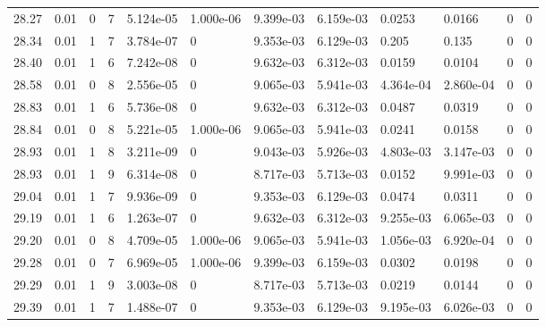 \documentclass[preview]{standalone}
\begin{document}
{{{{{{{{{{\begin{tabular}{L{1.2cm}C{1.2cm} C{0.3cm}C{0.5cm} C{1.4cm}C{1.4cm} C{1.4cm}C{1.4cm} C{1.6cm}C{1.6cm} C{1.6cm}C{1.6cm}}
  28.27  &  0.01  & 0     &  7 &  5.124e-05  & 1.000e-06  &  9.399e-03&   6.159e-03& 0.0253 & 0.0166   &  0 & 0  \\ 
  28.34  &  0.01  & 1     &  7 &  3.784e-07  & 0  &  9.353e-03&   6.129e-03& 0.205 & 0.135   &  0 & 0  \\ 
  28.40  &  0.01  & 1     &  6 &  7.242e-08  & 0  &  9.632e-03&   6.312e-03& 0.0159 & 0.0104   &  0 & 0  \\ 
  28.58  &  0.01  & 0     &  8 &  2.556e-05  & 0  &  9.065e-03&   5.941e-03& 4.364e-04 & 2.860e-04   &  0 & 0  \\ 
  28.83  &  0.01  & 1     &  6 &  5.736e-08  & 0  &  9.632e-03&   6.312e-03& 0.0487 & 0.0319   &  0 & 0  \\ 
  28.84  &  0.01  & 0     &  8 &  5.221e-05  & 1.000e-06  &  9.065e-03&   5.941e-03& 0.0241 & 0.0158   &  0 & 0  \\ 
  28.93  &  0.01  & 1     &  8 &  3.211e-09  & 0  &  9.043e-03&   5.926e-03& 4.803e-03 & 3.147e-03   &  0 & 0  \\ 
  28.93  &  0.01  & 1     &  9 &  6.314e-08  & 0  &  8.717e-03&   5.713e-03& 0.0152 & 9.991e-03   &  0 & 0  \\ 
  29.04  &  0.01  & 1     &  7 &  9.936e-09  & 0  &  9.353e-03&   6.129e-03& 0.0474 & 0.0311   &  0 & 0  \\ 
  29.19  &  0.01  & 1     &  6 &  1.263e-07  & 0  &  9.632e-03&   6.312e-03& 9.255e-03 & 6.065e-03   &  0 & 0  \\ 
  29.20  &  0.01  & 0     &  8 &  4.709e-05  & 1.000e-06  &  9.065e-03&   5.941e-03& 1.056e-03 & 6.920e-04   &  0 & 0  \\ 
  29.28  &  0.01  & 0     &  7 &  6.969e-05  & 1.000e-06  &  9.399e-03&   6.159e-03& 0.0302 & 0.0198   &  0 & 0  \\ 
  29.29  &  0.01  & 1     &  9 &  3.003e-08  & 0  &  8.717e-03&   5.713e-03& 0.0219 & 0.0144   &  0 & 0  \\ 
  29.39  &  0.01  & 1     &  7 &  1.488e-07  & 0  &  9.353e-03&   6.129e-03& 9.195e-03 & 6.026e-03   &  0 & 0  \\ 
\hline 
\end{tabular} 

}}}}}}}}}}
\end{document}
